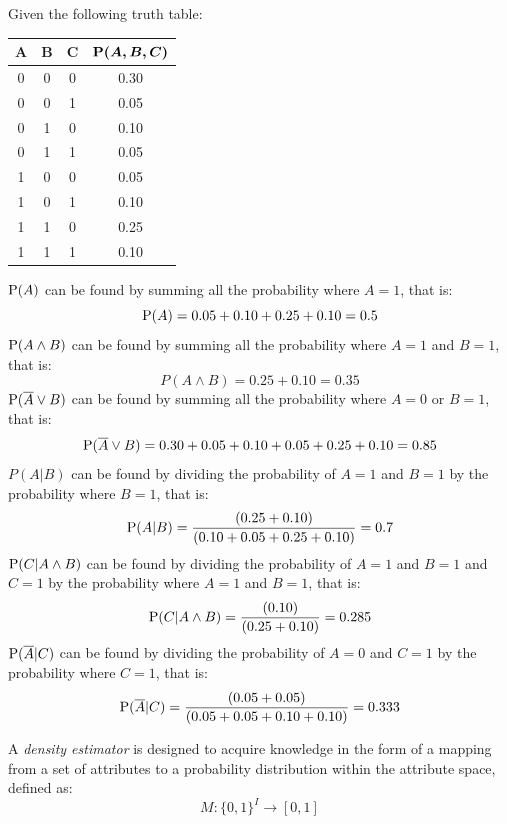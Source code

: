 \documentclass[12pt, a4paper]{report}
\begin{document}
    \begin{example}
        Given the following truth table: 
        \begin{table}[H]
            \centering
            \begin{tabular}{ccc|c}
            \hline
            $\boldsymbol{A}$ & $\boldsymbol{B}$ & $\boldsymbol{C}$ & $\boldsymbol{\textnormal{\textbf{P}}(A,B,C)}$ \\ \hline
            0   & 0   & 0   & 0.30       \\ 
            0   & 0   & 1   & 0.05       \\ 
            0   & 1   & 0   & 0.10       \\ 
            0   & 1   & 1   & 0.05       \\ 
            1   & 0   & 0   & 0.05       \\ 
            1   & 0   & 1   & 0.10       \\ 
            1   & 1   & 0   & 0.25       \\ 
            1   & 1   & 1   & 0.10       \\ \hline
            \end{tabular}
        \end{table}
        $\textnormal{P}(A)$ can be found by summing all the probability where $A=1$, that is: 
        \[\textnormal{P}(A) = 0.05 + 0.10 + 0.25 + 0.10 = 0.5\]
        $\textnormal{P}(A \land B)$ can be found by summing all the probability where $A=1$ and $B=1$, that is: 
        \[P(A \land B) = 0.25 + 0.10 = 0.35\]
        $\textnormal{P}(\overline{A} \lor B)$ can be found by summing all the probability where $A=0$ or $B=1$, that is: 
        \[\textnormal{P}(\overline{A} \lor B) = 0.30 + 0.05 + 0.10 + 0.05 + 0.25 + 0.10 = 0.85\]
        $P(A | B)$ can be found by dividing the probability of $A=1$ and $B=1$ by the probability where $B=1$, that is: 
        \[\textnormal{P}(A | B) = \dfrac{(0.25+0.10)}{(0.10+0.05+0.25+0.10)}=0.7\]
        $\textnormal{P}(C | A \land B)$ can be found by dividing the probability of $A=1$ and $B=1$ and $C=1$ by the probability where $A=1$ and $B=1$, that is: 
        \[\textnormal{P}(C | A \land B) = \dfrac{(0.10)}{(0.25+0.10)}=0.285\]
        $\textnormal{P}(\overline{A} | C)$ can be found by dividing the probability of $A=0$ and $C=1$ by the probability where $C=1$, that is: 
        \[\textnormal{P}(\overline{A} | C) = \dfrac{(0.05+0.05)}{(0.05+0.05+0.10+0.10)}=0.333\]
    \end{example}
    \begin{definition}
        A \emph{density estimator}  is designed to acquire knowledge in the form of a mapping from a set of attributes to a probability distribution within the attribute space, defined as:
        \[M:\{0,1\}^I \rightarrow [0,1]\]
    \end{definition}
\end{document}
